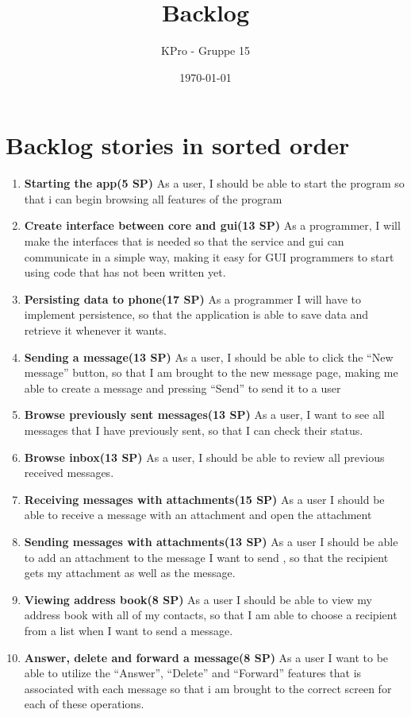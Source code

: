 \documentclass[a4paper, norsk, 12pt]{article}
\author{KPro - Gruppe 15}
\title{Backlog}
\date{\today}
\newcommand{\SP}[1]{(#1 SP)}
\begin{document}
	\maketitle
	\pagebreak
	\section{Backlog stories in sorted order }
		\begin{enumerate}
			\item {\bf Starting the app\SP{5}} As a user, I should be able to start the program so that i can begin browsing all features of the program
			\item {\bf Create interface between core and gui\SP{13}} As a programmer, I will make the interfaces that is needed so that the service and gui can communicate in a simple way, making it easy for GUI programmers to start using code that has not been written yet.
			\item {\bf Persisting data to phone\SP{17}} As a programmer I will have to implement persistence, so that the application is able to save data and retrieve it whenever it wants.
			\item {\bf Sending a message\SP{13}} As a user, I should be able to click the ``New message'' button, so that I am brought to the new message page, making me able to create a message and pressing ``Send'' to send it to a user
			\item {\bf Browse previously sent messages\SP{13}} As a user, I want to see all messages that I have previously sent, so that I can check their status.
			\item {\bf Browse inbox\SP{13}} As a user, I should be able to review all previous received messages.
			\item {\bf Receiving messages with attachments\SP{15}} As a user I should be able to receive a message with an attachment and open the attachment
			\item {\bf Sending messages with attachments\SP{13}} As a user I should be able to add an attachment to the message I want to send , so that the recipient gets my attachment as well as the message.
			\item {\bf Viewing address book\SP{8}} As a user I should be able to view my address book with all of my contacts, so that I am able to choose a recipient from a list when I want to send a message.
			\item {\bf Answer, delete and forward a message\SP{8}} As a user I want to be able to utilize the ``Answer'', ``Delete'' and ``Forward'' features that is associated with each message so that i am brought to the correct screen for each of these operations.

\end{enumerate}
\end{document}
